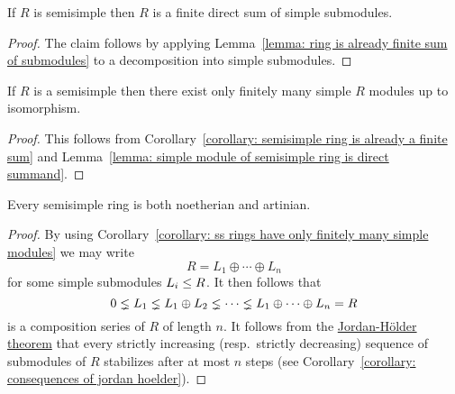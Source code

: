 \begin{corollary}
  \label{corollary: semisimple ring is already a finite sum}
  If $R$ is semisimple then $R$ is a finite direct sum of simple submodules.
\end{corollary}


\begin{proof}
 The claim follows by applying Lemma~\ref{lemma: ring is already finite sum of submodules} to a decomposition into simple submodules.
\end{proof}


\begin{corollary}
  \label{corollary: ss rings have only finitely many simple modules}
  If $R$ is a semisimple then there exist only finitely many simple $R$ modules up to isomorphism.
\end{corollary}


\begin{proof}
  This follows from Corollary~\ref{corollary: semisimple ring is already a finite sum} and Lemma~\ref{lemma: simple module of semisimple ring is direct summand}.
\end{proof}


\begin{corollary}
  \label{corollary: semisimple rings are notherian artinian}
  Every semisimple ring is both noetherian and artinian.
\end{corollary}


\begin{proof}
  By using Corollary~\ref{corollary: ss rings have only finitely many simple modules} we may write
  \[
    R = L_1 \oplus \dotsb \oplus L_n
  \]
  for some simple submodules $L_i \leq R$.
  It then follows that
  \[
                0
    \lneq L_1
    \lneq L_1 \oplus L_2
    \lneq \dotsb
    \lneq L_1 \oplus \dotsb \oplus L_n
    =           R
  \]
  is a composition series of $R$ of length $n$.
  It follows from the \hyperref[theorem: jordan hoelder theorem]{Jordan-Hölder theorem} that every strictly increasing (resp.\ strictly decreasing) sequence of submodules of $R$ stabilizes after at most $n$ steps (see Corollary~\ref{corollary: consequences of jordan hoelder}).
\end{proof}


